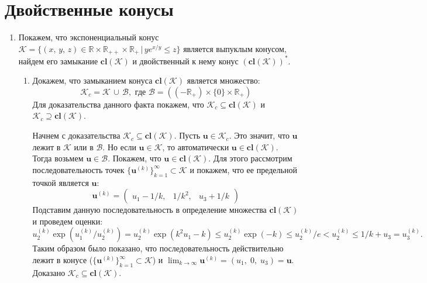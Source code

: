 \documentclass[a4paper,12pt]{article}
\begin{document}
	\section{Двойственные конусы}
	
	\begin{enumerate}
		\item
		
		Покажем, что экспоненциальный конус $\mathcal{K} = \{(x,\,y,\,z)\in \mathbb{R} \times \mathbb{R}_{++} \times \mathbb{R}_{+} \,|\, y e^{x/y} \leqslant z\}$ является выпуклым конусом, найдем его замыкание  $\textbf{cl}(\mathcal{K})$ и двойственный к нему конус $(\textbf{cl}(\mathcal{K}))^*$.
		
		\begin{enumerate}
			\item 
			Докажем, что замыканием конуса $\textbf{cl}(\mathcal{K})$ является множество:
			\begin{equation*}
				\mathcal{K}_{c} = \mathcal{K}\,\cup\, \mathcal{B}, \text{ где } \mathcal{B} = \left( (-\mathbb{R}_+) \times \{0\} \times \mathbb{R}_+\right) 
			\end{equation*}
			Для доказательства данного факта покажем, что $\mathcal{K}_{c} \subseteq \textbf{cl}(\mathcal{K})$ и $\mathcal{K}_{c} \supseteq \textbf{cl}(\mathcal{K})$.
			
			Начнем с доказательства $\mathcal{K}_{c} \subseteq \textbf{cl}(\mathcal{K})$. Пусть $\mathbf{u}\in\mathcal{K}_{c}$. Это значит, что $\mathbf{u}$ лежит в $\mathcal{K}$ или в $\mathcal{B}$. Но если $\mathbf{u} \in\mathcal{K} $, то автоматически $\mathbf{u} \in\textbf{cl}(\mathcal{K}) $. Тогда возьмем $\mathbf{u} \in \mathcal{B}$. Покажем, что $\mathbf{u} \in \textbf{cl}(\mathcal{K})$. Для этого рассмотрим последовательность точек $\{ \mathbf{u}^{(k)} \}_{k=1}^{\infty} \subset \mathcal{K} $ и покажем, что ее предельной точкой является $\mathbf{u}$:
			\begin{equation*}
				\mathbf{u}^{(k)} = \begin{pmatrix} u_1 - 1/k, & 1/k^2, & u_3 + 1/k \end{pmatrix}
			\end{equation*}
			Подставим данную последовательность в определение множества $\textbf{cl}(\mathcal{K})$ и проведем оценки: 
			\begin{equation*}
				u_2^{(k)} \exp\left(u_1^{(k)}/u_2^{(k)}\right) = u_2^{(k)} \exp\left(k^2 u_1 - k\right)  \leqslant u_2^{(k)} \exp(-k) \leqslant u_2^{(k)}/e < u_2^{(k)} \leqslant 1/k + u_3 = u_3^{(k)}.
			\end{equation*}
			Таким образом было показано, что последовательность действительно лежит в конусе ($\{ \mathbf{u}^{(k)} \}_{k=1}^{\infty} \subset \mathcal{K} $) и $\lim_{k \rightarrow \infty} \mathbf{u}^{(k)} = (u_1,\; 0,\; u_3) = \mathbf{u}$. Доказано $\mathcal{K}_{c} \subseteq \textbf{cl}(\mathcal{K})$.
			

\end{enumerate}
\end{enumerate}
\end{document}
